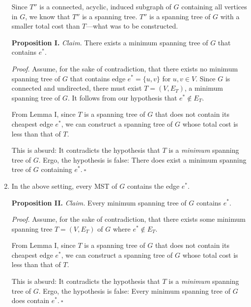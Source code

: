 \begin{enumerate}
\begin{solution}
Since $T''$ is a connected, acyclic, induced subgraph of $G$ containing all vertices in $G$, we know that $T''$ is a spanning tree. $T''$ is a spanning tree of $G$ with a smaller total cost than $T$---what was to be constructed.

\textbf{Proposition I. }\textit{Claim. }There exists a minimum spanning tree of $G$ that contains $e^*$.

\textit{Proof. }Assume, for the sake of contradiction, that there exists no minimum spanning tree of $G$ that contains edge $e^*=\{u,v\}$ for $u,v\in V$. Since $G$ is connected and undirected, there must exist $T=(V,E_T)$, a minimum spanning tree of $G$. It follows from our hypothesis that $e^*\notin E_T$.

From Lemma I, since $T$ is a spanning tree of $G$ that does not contain its cheapest edge $e^*$, we can construct a spanning tree of $G$ whose total cost is less than that of $T$.

This is absurd: It contradicts the hypothesis that $T$ is a \textit{minimum} spanning tree of $G$. Ergo, the hypothesis is false: There does exist a minimum spanning tree of $G$ containing $e^*.~\square$
\end{solution}
\newpage
\item In the above setting, every MST of $G$ contains the edge $e^*$.
\begin{solution}
\textbf{Proposition II. }\textit{Claim. }Every minimum spanning tree of $G$ contains $e^*$.

\textit{Proof. }Assume, for the sake of contradiction, that there exists some minimum spanning tree $T=(V,E_T)$ of $G$ where $e^*\notin E_T$.

From Lemma I, since $T$ is a spanning tree of $G$ that does not contain its cheapest edge $e^*$, we can construct a spanning tree of $G$ whose total cost is less than that of $T$.

This is absurd: It contradicts the hypothesis that $T$ is a \textit{minimum} spanning tree of $G$. Ergo, the hypothesis is false: Every minimum spanning tree of $G$ does contain $e^*.~\square$
\end{solution}
\newpage
\end{enumerate}

